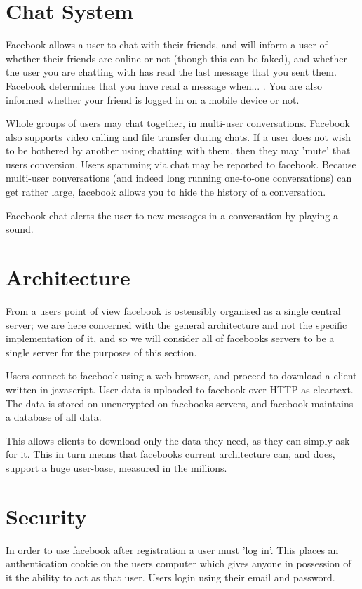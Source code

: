 \section{Chat System}
Facebook allows a user to chat with their friends, and will inform a user of
whether their friends are online or not (though this can be faked), and whether
the user you are chatting with has read the last message that you sent them.
Facebook determines that you have read a message when... . You are also informed whether your friend is logged in on a mobile
device or not.

Whole groups of users may chat together, in multi-user conversations. Facebook
also supports video calling and file transfer during chats. If a user does not
wish to be bothered by another using chatting with them, then they may 'mute'
that users conversion. Users spamming via chat may be reported to facebook.
Because multi-user conversations (and indeed long running one-to-one
conversations) can get rather large, facebook allows you to hide the history of
a conversation.

Facebook chat alerts the user to new messages in a conversation by playing a
sound.

\section{Architecture}
From a users point of view facebook is ostensibly organised as a single central
server; we are here concerned with the general architecture and not the
specific implementation of it, and so we will consider all of facebooks servers
to be a single server for the purposes of this section.

Users connect to facebook using a web browser, and proceed to download a client
written in javascript. User data is uploaded to facebook over HTTP as cleartext.
The data is stored on unencrypted on facebooks servers, and facebook maintains
a database of all data.

This allows clients to download only the data they need, as they can simply ask
for it. This in turn means that facebooks current architecture can, and does,
support a huge user-base, measured in the millions.


\section{Security}
In order to use facebook after registration a user must 'log in'. This places an
authentication cookie on the users computer which gives anyone in possession of
it the ability to act as that user. Users login using their email and password.

